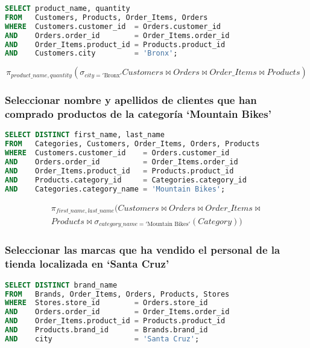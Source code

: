 \begin{lstlisting}[language=SQL]
SELECT product_name, quantity
FROM   Customers, Products, Order_Items, Orders
WHERE  Customers.customer_id  = Orders.customer_id
AND    Orders.order_id        = Order_Items.order_id
AND    Order_Items.product_id = Products.product_id
AND    Customers.city         = 'Bronx';
\end{lstlisting}

\[\pi_{product\_name,quantity}(\sigma_{city='\text{Bronx}'}Customers\bowtie Orders\bowtie Order\_Items\bowtie Products)\]

\pagebreak

\subsubsection{Seleccionar nombre y apellidos de clientes que han comprado productos de la categoría `Mountain Bikes'}

\begin{lstlisting}[language=SQL]
SELECT DISTINCT first_name, last_name
FROM   Categories, Customers, Order_Items, Orders, Products
WHERE  Customers.customer_id    = Orders.customer_id
AND    Orders.order_id          = Order_Items.order_id
AND    Order_Items.product_id   = Products.product_id
AND    Products.category_id     = Categories.category_id
AND    Categories.category_name = 'Mountain Bikes';
\end{lstlisting}

\[
\begin{split}
\pi_{first\_name,last\_name}(Customers\bowtie Orders\bowtie Order\_Items\bowtie \\
Products\bowtie\sigma_{category\_name='\text{Mountain Bikes}'}(Category))
\end{split}
\]

\subsubsection{Seleccionar las marcas que ha vendido el personal de la tienda localizada en `Santa Cruz'}

\begin{lstlisting}[language=SQL]
SELECT DISTINCT brand_name
FROM   Brands, Order_Items, Orders, Products, Stores
WHERE  Stores.store_id        = Orders.store_id
AND    Orders.order_id        = Order_Items.order_id
AND    Order_Items.product_id = Products.product_id
AND    Products.brand_id      = Brands.brand_id
AND    city                   = 'Santa Cruz';
\end{lstlisting}


